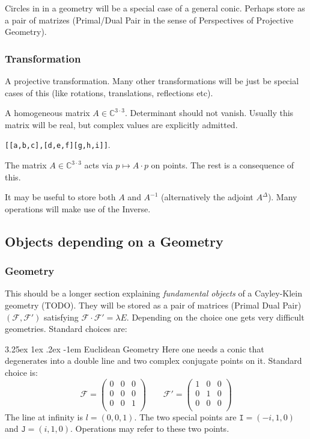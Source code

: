 \documentclass[11pt]{article}
\makeatletter
\renewcommand\paragraph{\@startsection{paragraph}{5}{\z@}%
  {3.25ex \@plus1ex \@minus.2ex}%
  {-1em}%
  {\normalfont\normalsize\bfseries}}
\makeatother
\begin{document}
\medskip
{}
Circles in in a geometry will be a special case of a general conic. 
Perhaps store as a pair of matrizes (Primal/Dual Pair in the sense of Perspectives of Projective Geometry).


\subsubsection{Transformation}

 A projective transformation. Many other transformations will be just be special cases of this (like rotations, translations, reflections etc).




\medskip
{} A homogeneous matrix $A\in\mathbb{C}^{3\cdot 3}$.
Determinant should not vanish. Usually this matrix will be real, but complex values are explicitly admitted.



\medskip
{} {\tt [[a,b,c],[d,e,f][g,h,i]]}. 

\medskip
{} 
The matrix $A\in\mathbb{C}^{3\cdot 3}$ acts via $p\mapsto A\cdot p$ on points. The rest is a consequence of this.


\medskip
{}
It may be useful to store both $A$ and $A^{-1}$ (alternatively the adjoint $A^{\Delta}$). Many operations will make use of the Inverse.


\subsection{Objects depending on a Geometry}
\subsubsection{Geometry}
This should be a longer section explaining {\it fundamental objects} of a Cayley-Klein geometry (TODO).
They will be stored as a pair of matrices (Primal Dual Pair) $({\mathcal F},{\mathcal F'})$ satisfying ${\mathcal F}\cdot{\mathcal F'}=\lambda E$. Depending on the choice one gets very difficult geometries. Standard choices are:

\paragraph{Euclidean Geometry}
Here one needs a conic that degenerates into a double line and two complex conjugate points on it. Standard choice is:
\[
{\mathcal F}=
\begin{pmatrix}
0&0&0\\
0&0&0\\
0&0&1\\
\end{pmatrix}
\qquad
{\mathcal F'}=
\begin{pmatrix}
1&0&0\\
0&1&0\\
0&0&0\\
\end{pmatrix}
\]
The line at infinity is $l=(0,0,1)$. The two special points are 
${\mathtt I}=(-i,1,0)$ and
${\mathtt J}=(i,1,0)$. Operations may refer to these two points.
\end{document}
